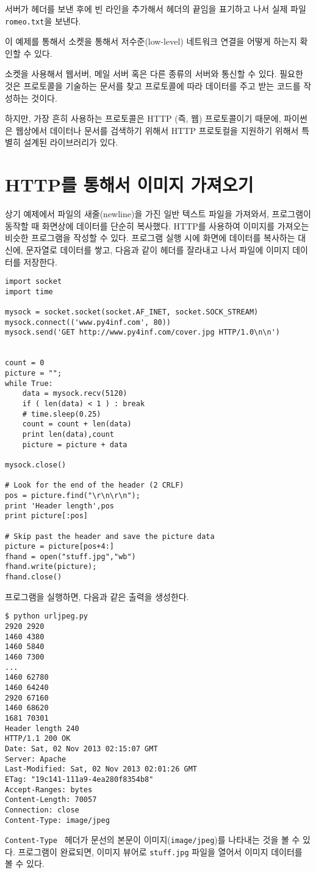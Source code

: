 서버가 헤더를 보낸 후에 빈 라인을 추가해서 헤더의 끝임을 표기하고 나서 실제 파일{\tt romeo.txt}을 보낸다.

이 예제를 통해서 소켓을 통해서 저수준(low-level) 네트워크 연결을 어떻게 하는지 확인할 수 있다.

소켓을 사용해서 웹서버, 메일 서버 혹은 다른 종류의 서버와 통신할 수 있다.
필요한 것은 프로토콜을 기술하는 문서를 찾고 프로토콜에 따라 데이터를 주고 받는 코드를 작성하는 것이다.

하지만, 가장 흔히 사용하는 프로토콜은 HTTP (즉, 웹) 프로토콜이기 때문에, 파이썬은 웹상에서 데이터나 문서를 검색하기 위해서
HTTP 프로토컬을 지원하기 위해서 특별히 설계된 라이브러리가 있다.


\section{HTTP를 통해서 이미지 가져오기}


상기 예제에서 파일의 새줄(newline)을 가진 일반 텍스트 파일을 가져와서, 프로그램이 동작할 때 화면상에 데이터를 단순히 복사했다.
HTTP를 사용하여 이미지를 가져오는 비슷한 프로그램을 작성할 수 있다. 프로그램 실행 시에 화면에 데이터를 복사하는 대신에,
문자열로 데이터를 쌓고, 다음과 같이 헤더를 잘라내고 나서 파일에 이미지 데이터를 저장한다. 

\beforeverb
\begin{verbatim}
import socket
import time

mysock = socket.socket(socket.AF_INET, socket.SOCK_STREAM)
mysock.connect(('www.py4inf.com', 80))
mysock.send('GET http://www.py4inf.com/cover.jpg HTTP/1.0\n\n')


count = 0
picture = "";
while True:
    data = mysock.recv(5120)
    if ( len(data) < 1 ) : break
    # time.sleep(0.25)
    count = count + len(data)
    print len(data),count
    picture = picture + data

mysock.close()

# Look for the end of the header (2 CRLF)
pos = picture.find("\r\n\r\n");
print 'Header length',pos
print picture[:pos]

# Skip past the header and save the picture data
picture = picture[pos+4:]
fhand = open("stuff.jpg","wb")
fhand.write(picture);
fhand.close()
\end{verbatim}
\afterverb
%

프로그램을 실행하면, 다음과 같은 출력을 생성한다.

\beforeverb
\begin{verbatim}
$ python urljpeg.py 
2920 2920
1460 4380
1460 5840
1460 7300
...
1460 62780
1460 64240
2920 67160
1460 68620
1681 70301
Header length 240
HTTP/1.1 200 OK
Date: Sat, 02 Nov 2013 02:15:07 GMT
Server: Apache
Last-Modified: Sat, 02 Nov 2013 02:01:26 GMT
ETag: "19c141-111a9-4ea280f8354b8"
Accept-Ranges: bytes
Content-Length: 70057
Connection: close
Content-Type: image/jpeg
\end{verbatim}
\afterverb
%
{\tt Content-Type } 헤더가 문선의 본문이 이미지({\tt image/jpeg})를 나타내는 것을 볼 수 있다.
프로그램이 완료되면, 이미지 뷰어로 {\tt stuff.jpg} 파일을 열어서 이미지 데이터를 볼 수 있다.

